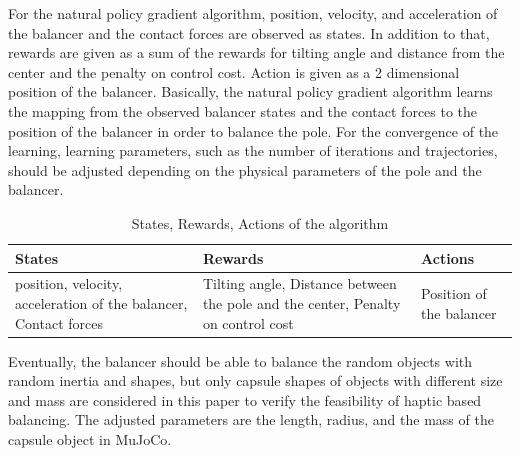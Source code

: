 \documentclass{article}
\begin{document}
For the natural policy gradient algorithm, position, velocity, and acceleration of the balancer and the contact forces are observed as states. In addition to that, rewards are given as a sum of the rewards for tilting angle and distance from the center and the penalty on control cost. Action is given as a 2 dimensional position of the balancer. Basically, the natural policy gradient algorithm learns the mapping from the observed balancer states and the contact forces to the position of the balancer in order to balance the pole.  For the convergence of the learning, learning parameters, such as the number of iterations and trajectories, should be adjusted depending on the physical parameters of the pole and the balancer. 

\begin{table}[h!]
\centering
  \begin{center}
  \begin{tabular}{ |p{3cm}|p{3cm}|p{3cm}| }
  \hline
  States & Rewards & Actions\\
  \hline  
  position, velocity, acceleration of the balancer, Contact forces & Tilting angle, Distance between the pole and the center, Penalty on control cost & Position of the balancer\\
  \hline
  \end{tabular}
  \end{center}
  \caption{States, Rewards, Actions of the algorithm}
  \label{table:1}
\end{table}

Eventually, the balancer should be able to balance the random objects with random inertia and shapes, but only capsule shapes of objects with different size and mass are considered in this paper to verify the feasibility of haptic based balancing. The adjusted parameters are the length, radius, and the mass of the capsule object in MuJoCo.
\end{document}
